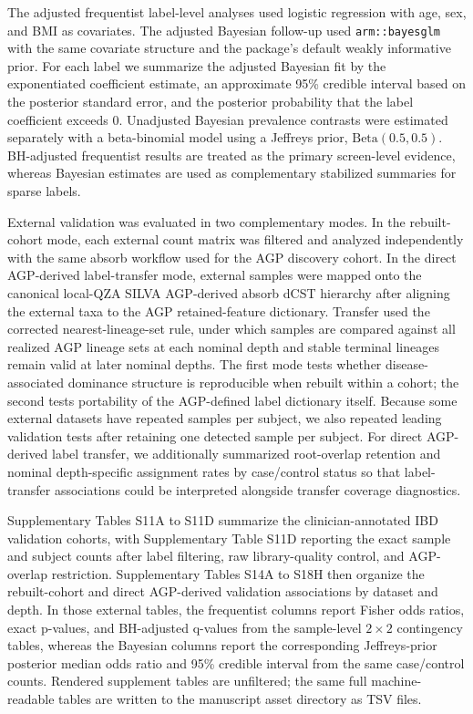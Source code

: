 \documentclass[11pt]{article}
\begin{document}
The adjusted frequentist label-level analyses used logistic regression
with age, sex, and BMI as covariates. The adjusted Bayesian follow-up
used \texttt{arm::bayesglm} with the same covariate structure and the
package's default weakly informative prior. For each label we summarize
the adjusted Bayesian fit by the exponentiated coefficient estimate, an
approximate 95\% credible interval based on the posterior standard
error, and the posterior probability that the label coefficient exceeds
0. Unadjusted Bayesian prevalence contrasts were estimated separately
with a beta-binomial model using a Jeffreys prior,
\(\mathrm{Beta}(0.5,0.5)\). BH-adjusted frequentist results are treated
as the primary screen-level evidence, whereas Bayesian estimates are used
as complementary stabilized summaries for sparse labels.

External validation was evaluated in two complementary modes. In the
rebuilt-cohort mode, each external count matrix was filtered and
analyzed independently with the same absorb workflow used for the AGP
discovery cohort. In the direct AGP-derived label-transfer mode,
external samples were mapped onto the canonical local-QZA SILVA
AGP-derived absorb dCST hierarchy after aligning the external taxa to
the AGP retained-feature dictionary. Transfer used the corrected
nearest-lineage-set rule, under which samples are compared against all
realized AGP lineage sets at each nominal depth and stable terminal
lineages remain valid at later nominal depths. The first mode tests
whether disease-associated dominance structure is reproducible when
rebuilt within a cohort; the second tests portability of the
AGP-defined label dictionary itself. Because some external datasets have
repeated samples per subject, we also repeated leading validation tests
after retaining one detected sample per subject. For direct AGP-derived
label transfer, we additionally summarized root-overlap retention and
nominal depth-specific assignment rates by case/control status so that
label-transfer associations could be interpreted alongside transfer
coverage diagnostics.

Supplementary Tables S11A to S11D summarize the clinician-annotated IBD
validation cohorts, with Supplementary Table S11D reporting the exact
sample and subject counts after label filtering, raw
library-quality control, and AGP-overlap restriction. Supplementary
Tables S14A to S18H then organize the rebuilt-cohort and direct
AGP-derived validation associations by dataset and depth. In those
external tables, the frequentist columns report Fisher odds ratios,
exact p-values, and BH-adjusted q-values from the sample-level \(2 \times 2\)
contingency tables, whereas the Bayesian columns report the
corresponding Jeffreys-prior posterior median odds ratio and 95\%
credible interval from the same case/control counts.
Rendered supplement tables are unfiltered; the same full
machine-readable tables are written to the manuscript asset directory as
TSV files.
\end{document}

